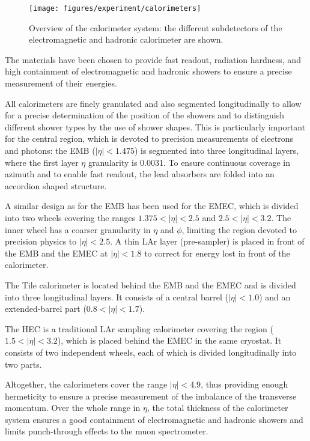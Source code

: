 \begin{figure}[ht]
\begin{center}
\texttt{[image: figures/experiment/calorimeters]}
\caption[Overview of the calorimeter system]{
  Overview of the calorimeter system:
  the different subdetectors of the electromagnetic and hadronic calorimeter are shown.}
\label{fig:calorimeters}
\end{center}
\end{figure}

The materials have been chosen to provide fast readout, 
radiation hardness, and high containment of electromagnetic and
hadronic showers to ensure
a precise measurement of their energies.

All calorimeters are finely granulated and also segmented
longitudinally to allow for a precise determination of the position of the showers and to
distinguish different shower types by the use of shower shapes.
This is particularly important for the central region, 
which is devoted to precision measurements of electrons and photons:
the EMB (\mbox{$|\eta| < 1.475$}) is segmented into three longitudinal
layers, where the first layer $\eta$ granularity is 0.0031.
To ensure continuous coverage in azimuth and to enable fast readout, 
the lead absorbers are folded into an accordion shaped structure.

A similar design as for the EMB has been used for the EMEC, 
which is divided into two wheels covering the ranges \mbox{$1.375 < |\eta| < 2.5$}
and \mbox{$2.5 < |\eta| < 3.2$}.
The inner wheel has a coarser granularity in $\eta$ and $\phi$, 
limiting the region devoted to precision physics to \mbox{$|\eta| < 2.5$}.
A thin LAr layer (pre-sampler) is placed in front of the EMB and the
EMEC at \mbox{$|\eta| < 1.8$} to correct for energy lost in front of the calorimeter.

The Tile calorimeter is located behind the EMB and the EMEC and is divided into three longitudinal layers.
It consists of a central barrel (\mbox{$|\eta| < 1.0$}) and an extended-barrel part (\mbox{$0.8 < |\eta| < 1.7$}).

The HEC is a traditional LAr sampling calorimeter covering the region (\mbox{$1.5 < |\eta| < 3.2$}), which is placed behind the EMEC in the same
cryostat.
It consists of two independent wheels, each of which is divided longitudinally into two parts.

Altogether, the calorimeters cover the range \mbox{$|\eta| < 4.9$},
thus providing enough hermeticity to ensure a precise measurement
of the imbalance of the transverse momentum.
Over the whole range in $\eta$, the total thickness of the calorimeter
system ensures a good containment of
electromagnetic and hadronic showers and limits punch-through effects to the muon spectrometer.

